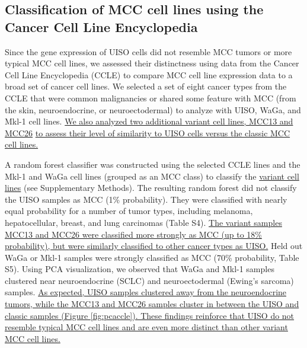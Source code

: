 \documentclass[10pt]{article}
\begin{document}
\subsection*{Classification of MCC cell lines using the Cancer Cell Line Encyclopedia}
Since the gene expression of UISO cells did not resemble MCC tumors or more typical MCC cell lines, we assessed their distinctness using data from the Cancer Cell Line Encyclopedia (CCLE)\citep{Barretina2012Cancer} to compare MCC cell line expression data to a broad set of cancer cell lines.
We selected a set of eight cancer types from the CCLE that were common malignancies or shared some feature with MCC (from the skin, neuroendocrine, or neuroectodermal) to analyze with UISO, WaGa, and Mkl-1 cell lines.
\uline{We also analyzed two additional variant cell lines, MCC13 and MCC26} \citep{Leonard1995Characterisation} \uline{to assess their level of similarity to UISO cells versus the classic MCC cell lines.}

A random forest classifier was constructed using the selected CCLE lines and the Mkl-1 and WaGa cell lines (grouped as an MCC class) to classify the \uline{variant cell lines} (see Supplementary Methods).
The resulting random forest did not classify the UISO samples as MCC (1\% probability).
They were classified with nearly equal probability for a number of tumor types, including melanoma, hepatocellular, breast, and lung carcinomas (Table S4).
\uline{The variant samples MCC13 and MCC26 were classified more strongly as MCC (up to 18\% probability), but were similarly classified to other cancer types as UISO.}
Held out WaGa or Mkl-1 samples were strongly classified as MCC (70\% probability, Table S5).
Using PCA visualization, we observed that WaGa and Mkl-1 samples clustered near neuroendocrine (SCLC) and neuroectodermal (Ewing’s sarcoma) samples. 
\uline{As expected, UISO samples clustered away from the neuroendocrine tumors, while the MCC13 and MCC26 samples cluster in between the UISO and classic samples (Figure \ref{fig:pcaccle}).
These findings reinforce that UISO do not resemble typical MCC cell lines and are even more distinct than other variant MCC cell lines.}
\end{document}

